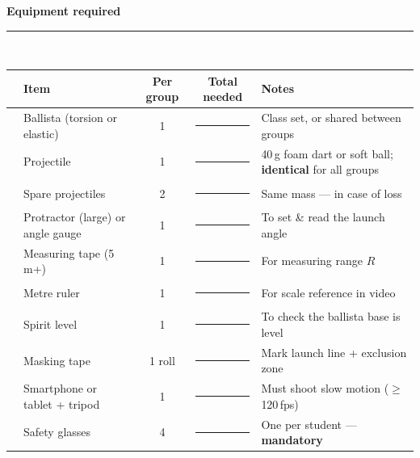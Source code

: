 \documentclass[11pt,a4paper]{article}
\newcommand{\sechead}[1]{%
  \vspace{0pt}%
  {\bfseries\large\color{HeadGrey} #1}\\[-2pt]
  {\color{RuleGrey}\rule{\linewidth}{0.8pt}}\\[1pt]
}
\newcommand{\cb}{\framebox[1.6ex]{\rule{0pt}{1.4ex}}\hspace{0.4em}}
\begin{document}
\sechead{Equipment required}
\begin{tabularx}{\linewidth}{@{}c L{6.3cm} c c X@{}}
\toprule
\textbf{\cb} & \textbf{Item} & \textbf{Per group} & \textbf{Total needed} & \textbf{Notes} \\
\midrule
\cb & Ballista (torsion or elastic) & 1 & \rule{1.5cm}{0.4pt} & Class set, or shared between groups \\
\cb & Projectile & 1 & \rule{1.5cm}{0.4pt} & 40\,g foam dart or soft ball; \textbf{identical} for all groups \\
\cb & Spare projectiles & 2 & \rule{1.5cm}{0.4pt} & Same mass --- in case of loss \\
\cb & Protractor (large) or angle gauge & 1 & \rule{1.5cm}{0.4pt} & To set \& read the launch angle \\
\cb & Measuring tape (5\,m+) & 1 & \rule{1.5cm}{0.4pt} & For measuring range $R$ \\
\cb & Metre ruler & 1 & \rule{1.5cm}{0.4pt} & For scale reference in video \\
\cb & Spirit level & 1 & \rule{1.5cm}{0.4pt} & To check the ballista base is level \\
\cb & Masking tape & 1 roll & \rule{1.5cm}{0.4pt} & Mark launch line + exclusion zone \\
\cb & Smartphone or tablet + tripod & 1 & \rule{1.5cm}{0.4pt} & Must shoot slow motion ($\geq$120\,fps) \\
\cb & Safety glasses & 4 & \rule{1.5cm}{0.4pt} & One per student --- \textbf{mandatory} \\
\bottomrule
\end{tabularx}
\end{document}
